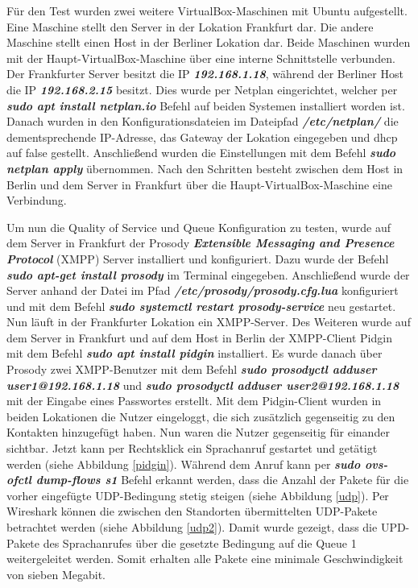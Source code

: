 \documentclass[fontsize=12pt,paper=a4,open=any,parskip=half,
  twoside=false,toc=listof,toc=bibliography,fleqn,leqno,
  captions=nooneline,captions=tableabove,british]{scrbook}
\begin{document}
Für den Test wurden zwei weitere VirtualBox-Maschinen mit Ubuntu aufgestellt. Eine Maschine stellt den Server in der Lokation Frankfurt dar. Die andere Maschine stellt einen Host in der Berliner Lokation dar. Beide Maschinen wurden mit der Haupt-VirtualBox-Maschine über eine interne Schnittstelle verbunden. Der Frankfurter Server besitzt die IP \textit{\textbf{192.168.1.18}}, während der Berliner Host die IP \textit{\textbf{192.168.2.15}} besitzt. Dies wurde per Netplan eingerichtet, welcher per \textit{\textbf{sudo apt install netplan.io}} Befehl auf beiden Systemen installiert worden ist. Danach wurden in den Konfigurationsdateien im Dateipfad \textit{\textbf{/etc/netplan/}} die dementsprechende IP-Adresse, das Gateway der Lokation eingegeben und dhcp auf false gestellt. Anschließend wurden die Einstellungen mit dem Befehl \textit{\textbf{sudo netplan apply}} übernommen. Nach den Schritten besteht zwischen dem Host in Berlin und dem Server in Frankfurt über die Haupt-VirtualBox-Maschine eine Verbindung.\par
Um nun die Quality of Service und Queue Konfiguration zu testen, wurde auf dem Server in Frankfurt der Prosody \textit{\textbf{Extensible Messaging and Presence Protocol}} (XMPP) Server installiert und konfiguriert. Dazu wurde der Befehl \textit{\textbf{sudo apt-get install prosody}} im Terminal eingegeben. Anschließend wurde der Server anhand der Datei im Pfad \textit{\textbf{/etc/prosody/prosody.cfg.lua}} konfiguriert und mit dem Befehl \textit{\textbf{sudo systemctl restart prosody-service}} neu gestartet. Nun läuft in der Frankfurter Lokation ein XMPP-Server. Des Weiteren wurde auf dem Server in Frankfurt und auf dem Host in Berlin der XMPP-Client Pidgin mit dem Befehl \textit{\textbf{sudo apt install pidgin}} installiert. Es wurde danach über Prosody zwei XMPP-Benutzer mit dem Befehl \textit{\textbf{sudo prosodyctl adduser user1@192.168.1.18}} und \textit{\textbf{sudo prosodyctl adduser user2@192.168.1.18}} mit der Eingabe eines Passwortes erstellt. Mit dem Pidgin-Client wurden in beiden Lokationen die Nutzer eingeloggt, die sich zusätzlich gegenseitig zu den Kontakten hinzugefügt haben. Nun waren die Nutzer gegenseitig für einander sichtbar. Jetzt kann per Rechtsklick ein Sprachanruf gestartet und getätigt werden (siehe Abbildung \ref{pidgin}). Während dem Anruf kann per \textit{\textbf{sudo ovs-ofctl dump-flows s1}} Befehl erkannt werden, dass die Anzahl der Pakete für die vorher eingefügte UDP-Bedingung stetig steigen (siehe Abbildung \ref{udp}). Per Wireshark können die zwischen den Standorten übermittelten UDP-Pakete betrachtet werden (siehe Abbildung \ref{udp2}). Damit wurde gezeigt, dass die UPD-Pakete des Sprachanrufes über die gesetzte Bedingung auf die Queue 1 weitergeleitet werden. Somit erhalten alle Pakete eine minimale Geschwindigkeit von sieben Megabit.
\end{document}
